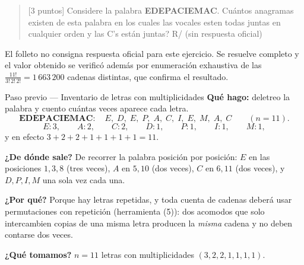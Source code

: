 \documentclass[11pt]{article}
\begin{document}
\begin{quote}
[3 puntos] Considere la palabra \textbf{EDEPACIEMAC}. Cu\'antos anagramas existen de esta palabra en los
cuales las vocales esten todas juntas en cualquier orden y las C's est\'an juntas?
\hfill R/ (sin respuesta oficial)
\end{quote}

\begin{nota}
El folleto no consigna respuesta oficial para este ejercicio. Se resuelve completo y el valor obtenido se
verific\'o adem\'as por enumeraci\'on exhaustiva de las $\frac{11!}{3!\,2!\,2!}=1\,663\,200$ cadenas
distintas, que confirma el resultado.
\end{nota}

\begin{paso}{Paso previo --- Inventario de letras con multiplicidades}
\textbf{Qu\'e hago:} deletreo la palabra y cuento cu\'antas veces aparece cada letra.
\[
\textbf{EDEPACIEMAC}:\quad E,\;D,\;E,\;P,\;A,\;C,\;I,\;E,\;M,\;A,\;C \qquad (n=11) .
\]
\[
E:3,\qquad A:2,\qquad C:2,\qquad D:1,\qquad P:1,\qquad I:1,\qquad M:1 ,
\]
y en efecto $3+2+2+1+1+1+1=11$.

\textbf{¿De d\'onde sale?} De recorrer la palabra posici\'on por posici\'on: $E$ en las posiciones
$1,3,8$ (tres veces), $A$ en $5,10$ (dos veces), $C$ en $6,11$ (dos veces), y $D,P,I,M$ una sola vez cada
una.

\textbf{¿Por qu\'e?} Porque hay letras repetidas, y toda cuenta de cadenas deber\'a usar permutaciones con
repetici\'on (herramienta (5)): dos acomodos que solo intercambien copias de una misma letra producen la
\emph{misma} cadena y no deben contarse dos veces.

\textbf{¿Qu\'e tomamos?} $n=11$ letras con multiplicidades $(3,2,2,1,1,1,1)$.
\end{paso}
\end{document}
